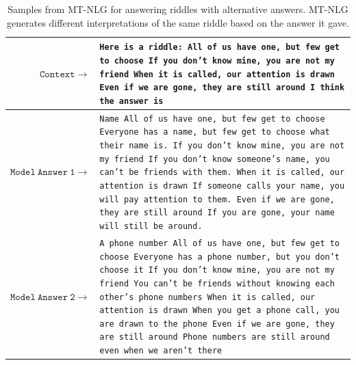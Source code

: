 \documentclass[11pt]{article}
\newcommand{\ours}{MT-NLG}
\begin{document}
\begin{table}[t]
\centering
\small
\begin{tabularx}{\textwidth}{rX}
 \toprule
 \textbf{$\mathtt{Context \rightarrow}$} & \texttt{Here is a riddle:\newline
All of us have one, but few get to choose\newline
If you don't know mine, you are not my friend\newline
When it is called, our attention is drawn\newline
Even if we are gone, they are still around\newline
\newline
I think the answer is}
 \\
 \midrule
\textbf{$\mathtt{Model~Answer~1 \rightarrow}$} &  \texttt{Name\newline
All of us have one, but few get to choose\newline
Everyone has a name, but few get to choose what their name is.\newline
If you don't know mine, you are not my friend\newline
If you don't know someone's name, you can't be friends with them.\newline
When it is called, our attention is drawn\newline
If someone calls your name, you will pay attention to them.\newline
Even if we are gone, they are still around\newline
If you are gone, your name will still be around.\newline
}
 \\
\textbf{$\mathtt{Model~Answer~2 \rightarrow}$} &  \texttt{A phone number\newline
All of us have one, but few get to choose\newline
Everyone has a phone number, but you don’t choose it\newline
If you don't know mine, you are not my friend\newline
You can't be friends without knowing each other's phone numbers\newline
When it is called, our attention is drawn\newline
When you get a phone call, you are drawn to the phone\newline
Even if we are gone, they are still around\newline
Phone numbers are still around even when we aren't there
} \\
\bottomrule
\end{tabularx}
\caption{Samples from {\ours} for answering riddles with alternative answers. {\ours} generates different interpretations of the same riddle based on the answer it gave.}
\label{tab:riddles-alt-answers}
\end{table}
\end{document}
